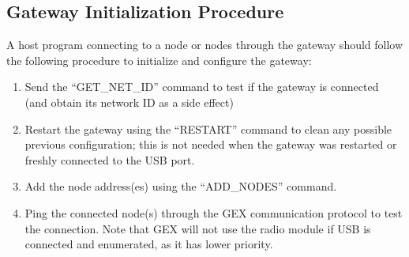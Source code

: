 \subsection{Gateway Initialization Procedure}

A host program connecting to a node or nodes through the gateway should follow the following procedure to initialize and configure the gateway:

\begin{enumerate}
	\item Send the ``GET\_NET\_ID'' command to test if the gateway is connected (and obtain its network ID as a side effect)
	\item Restart the gateway using the ``RESTART'' command to clean any possible previous configuration; this is not needed when the gateway was restarted or freshly connected to the \gls{USB} port.
	\item Add the node address(es) using the ``ADD\_NODES'' command.
	\item Ping the connected node(s) through the GEX communication protocol to test the connection. Note that GEX will not use the radio module if \gls{USB} is connected and enumerated, as it has lower priority. 
\end{enumerate}































